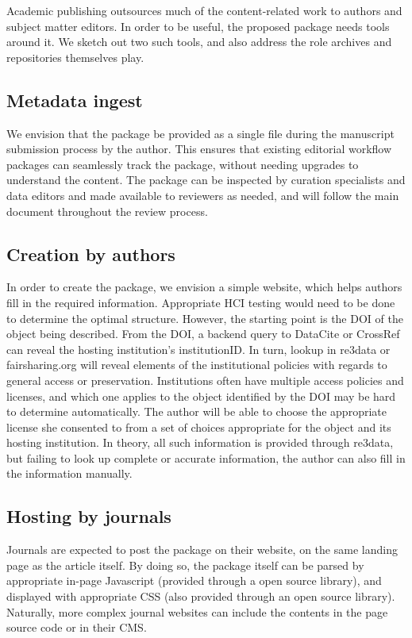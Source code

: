 Academic publishing outsources much of the content-related work to authors and subject matter editors. In order to be useful, the proposed package needs tools around it. We sketch out two such tools, and also address the role archives and repositories themselves play. 
\subsection{Metadata ingest}

We envision that the package be provided as a single file during the manuscript submission process by the author. This ensures that existing editorial workflow packages can seamlessly track the package, without needing upgrades to understand the content. The package can be inspected by curation specialists and data editors and made available to reviewers as needed, and will follow the main document throughout the review process. 
           
\subsection{Creation by authors}
In order to create the package, we envision a simple website, which helps authors fill in the required information. Appropriate \ac{HCI} testing would need to be done to determine the optimal structure. However, the starting point is the DOI of the object being described. From the DOI, a backend query to DataCite or CrossRef can reveal the hosting institution's institutionID. In turn, lookup in re3data or fairsharing.org will reveal elements of the institutional policies with regards to general access or preservation. Institutions often have multiple access policies and licenses, and which one applies to the object identified by the DOI may be hard to determine automatically. The author will be able to choose the appropriate license she consented to from a set of choices appropriate for the object and its hosting institution. In theory, all such information is provided through re3data, but failing to look up complete or accurate information, the author can also fill in the information manually. 
           
\subsection{Hosting by journals}
Journals are expected to post the package on their website, on the same landing page as the article itself. By doing so, the package itself can be parsed by appropriate in-page Javascript (provided through a open source library), and displayed with appropriate CSS (also provided through an open source library). Naturally, more complex journal websites can include the contents in the page source code or in their \ac{CMS}. 

